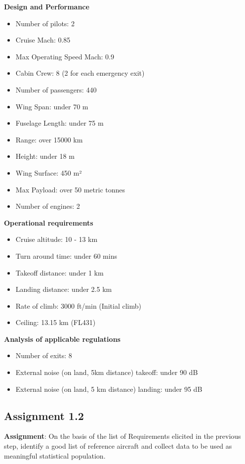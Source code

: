 \documentclass{article}
\begin{document}
\textbf{Design and Performance\label{Design_and_performance}}
\begin{itemize}
    \item Number of pilots: 2
    \item Cruise Mach: 0.85
    \item Max Operating Speed Mach: 0.9
    \item Cabin Crew: 8 (2 for each emergency exit)
    \item Number of passengers: 440
    \item Wing Span: under 70 m
    \item Fuselage Length: under 75 m
    \item Range: over 15000 km
    \item Height: under 18 m
    \item Wing Surface: 450 m²
    \item Max Payload: over 50 metric tonnes
    \item Number of engines: 2
\end{itemize}
\pagebreak
\textbf{Operational requirements\label{Operational_requirements}}
\begin{itemize}
    \item Cruise altitude: 10 - 13 km
    \item Turn around time: under 60 mins
    \item Takeoff distance: under 1 km
    \item Landing distance: under 2.5 km
    \item Rate of climb: 3000 ft/min (Initial climb)
    \item Ceiling: 13.15 km (FL431)
\end{itemize}

\textbf{Analysis of applicable regulations\label{Analysis_applicable_regulations}}
\begin{itemize}
    \item Number of exits: 8
    \item External noise (on land, 5km distance) takeoff: under 90 dB
    \item External noise (on land, 5 km distance) landing: under 95 dB
\end{itemize}
\pagebreak
\subsection{Assignment 1.2\label{Assignment_1.2}}
\textbf{Assignment}: On the basis of the list of Requirements elicited
in the previous step, identify a good list of reference aircraft and
collect data to be used as meaningful statistical population.\\ \\ \\ 
\end{document}
